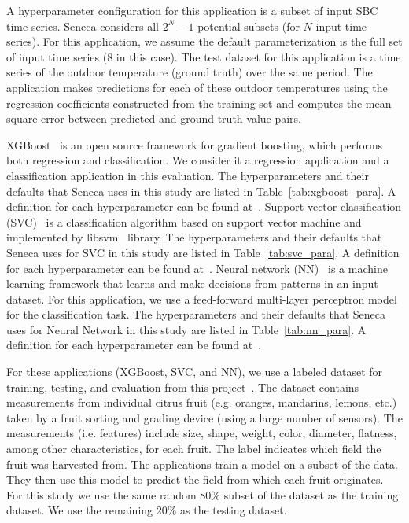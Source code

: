 A hyperparameter configuration for this application is a subset of input SBC time series.
Seneca considers all \texttt{$2^N - 1$} potential subsets (for $N$ input time series).
For this application,
we assume the default parameterization is the full set of input time series (8 in this case).
The test dataset for this application is a time series of the outdoor temperature (ground truth) 
over the same period.  The application makes predictions for each of these outdoor temperatures
using the regression coefficients constructed from the training set
and computes the mean square error between predicted and ground truth value pairs.


XGBoost~\cite{ref:xgboost-web} is an open source framework for gradient boosting, which 
performs both regression and classification. We consider it a regression application and
a classification application in this evaluation.  
The hyperparameters and their defaults that Seneca uses in this study are listed in Table~\ref{tab:xgboost_para}. A definition for each hyperparameter can be found at~\cite{ref:xgboostparams}.
Support vector classification (SVC)~\cite{ref:svc} is a classification algorithm 
based on support vector machine and implemented by libsvm~\cite{ref:libsvm} library.
The hyperparameters and their defaults that Seneca uses for SVC in this study are listed in Table~\ref{tab:svc_para}. A definition for each hyperparameter can be found at~\cite{ref:svcparams}.
Neural network (NN)~\cite{ref:neural_network} is a machine learning framework that learns 
and make decisions from patterns in an input dataset. For this application, 
we use a feed-forward multi-layer perceptron model~\cite{ref:feedforward_nn} 
for the classification task.
The hyperparameters and their defaults that Seneca uses for Neural Network in this study are listed in Table~\ref{tab:nn_para}. A definition for each hyperparameter can be found at~\cite{ref:nnparams}.

For these applications (XGBoost, SVC, and NN), we use a labeled
dataset for training, testing, and evaluation from this
project~\cite{iot-cpu}. The dataset contains measurements from individual
citrus fruit (e.g. oranges, mandarins, lemons, etc.) taken by a fruit sorting
and grading device (using a large number of sensors).  The measurements (i.e.
features) include size, shape, weight, color, diameter, flatness, among other
characteristics, for each fruit.  The label indicates which field the fruit
was harvested from.  The applications train a model on a subset of the
data.  They then use this model to predict the field
from which each fruit originates. For this study we use the same random 80\%
subset of the dataset as the training dataset.  We use the remaining 20\% as the
testing dataset.

